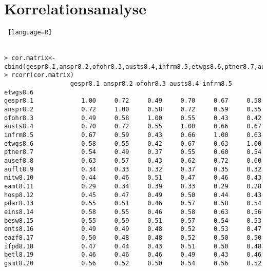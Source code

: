 \section{Korrelationsanalyse}
\begin{lstlisting} [language=R]


> cor.matrix<-cbind(gespr8.1,anspr8.2,ofohr8.3,austs8.4,infrm8.5,etwgs8.6,ptner8.7,ausef8.8,auflt8.9,mitw8.10,eamt8.11,hosp8.12,pdar8.13,eins8.14,besw8.15,ents8.16,eazf8.17,ifpd8.18,betl8.19,gsmt8.20)
> rcorr(cor.matrix)
                  gespr8.1 anspr8.2 ofohr8.3 austs8.4 infrm8.5 etwgs8.6
gespr8.1             1.00     0.72     0.49     0.70     0.67     0.58
anspr8.2             0.72     1.00     0.58     0.72     0.59     0.55
ofohr8.3             0.49     0.58     1.00     0.55     0.43     0.42
austs8.4             0.70     0.72     0.55     1.00     0.66     0.67
infrm8.5             0.67     0.59     0.43     0.66     1.00     0.63
etwgs8.6             0.58     0.55     0.42     0.67     0.63     1.00
ptner8.7             0.54     0.49     0.37     0.55     0.60     0.54
ausef8.8             0.63     0.57     0.43     0.62     0.72     0.60
auflt8.9             0.34     0.33     0.32     0.37     0.35     0.32
mitw8.10             0.44     0.46     0.51     0.47     0.46     0.43
eamt8.11             0.29     0.34     0.39     0.33     0.29     0.28
hosp8.12             0.45     0.47     0.49     0.50     0.44     0.43
pdar8.13             0.55     0.51     0.46     0.57     0.58     0.54
eins8.14             0.58     0.55     0.46     0.58     0.63     0.56
besw8.15             0.55     0.59     0.51     0.57     0.54     0.53
ents8.16             0.49     0.49     0.48     0.52     0.53     0.47
eazf8.17             0.50     0.48     0.48     0.52     0.50     0.50
ifpd8.18             0.47     0.44     0.43     0.51     0.50     0.48
betl8.19             0.46     0.46     0.46     0.49     0.43     0.46
gsmt8.20             0.56     0.52     0.50     0.54     0.56     0.52


\end{lstlisting}
